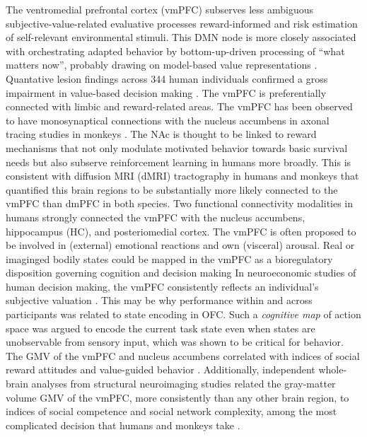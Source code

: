 \documentclass{article} %
\begin{document}
The ventromedial prefrontal cortex (vmPFC) subserves
less ambiguous subjective-value-related evaluative processes
reward-informed and risk estimation of self-relevant environmental stimuli.
This DMN node is more closely associated with
orchestrating adapted behavior by bottom-up-driven
processing of “what matters now”,
probably drawing on model-based value representations
\citep{doherty2015structure}.
Quantative lesion findings across 344 human individuals confirmed
a gross impairment in value-based decision making
\citep{glascher2012lesion}.
The vmPFC is preferentially connected with limbic and reward-related areas.
The vmPFC has been observed to have monosynaptical connections
with the nucleus accumbens
in axonal tracing studies in monkeys \citep{haber1995orbital}.
The NAc is thought to be linked to reward mechanisms that not
only modulate motivated behavior towards basic survival needs but also
subserve reinforcement learning in humans more broadly.
This is consistent with diffusion MRI (dMRI) tractography in humans and monkeys
\citep{croxson2005quantitative} that
quantified this brain regions to
be substantially more likely connected to the vmPFC than dmPFC in both species.
Two functional connectivity modalities in humans strongly connected
the vmPFC with the nucleus accumbens, hippocampus (HC),
and posteriomedial cortex.
%
The vmPFC is often proposed to be involved in (external) emotional
reactions and own (visceral) arousal.
Real or imaginged bodily states could be mapped in the vmPFC
as a bioregulatory disposition governing cognition
and decision making \citep{damasio1996somatic}
In neuroeconomic studies of human decision making,
the vmPFC consistently reflects an individual’s subjective
valuation
\citep{behrens2008associative}.
This may be why performance within and across participants
was related to state encoding in OFC.
Such a \textit{cognitive map} of action space was argued to encode
the current task state even when states are unobservable from sensory input,
which was shown to be critical for behavior.
The GMV of the vmPFC and nucleus accumbens
correlated with indices of social reward attitudes and
value-guided behavior \citep{lebreton2009automatic}.
Additionally,
independent whole-brain analyses from structural
neuroimaging studies related the gray-matter volume GMV of the vmPFC,
more consistently than any other
brain region, to indices of
social competence and social network complexity,
among the most complicated decision that humans and monkeys take
\citep{behrens2009computation}.
%
\end{document}

